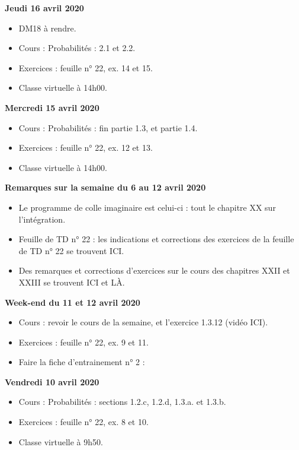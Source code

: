 \documentclass[12pt,a4paper]{article}
\begin{document}
\noindent\textbf{Jeudi 16 avril 2020}
\begin{itemize}
\item DM18 à rendre.
\item Cours : Probabilités : 2.1 et 2.2.
\item Exercices : feuille n° 22, ex. 14 et 15.
\item Classe virtuelle à 14h00.\vspace{.4cm}
\end{itemize}

\noindent\textbf{Mercredi 15 avril 2020}
\begin{itemize}
\item Cours : Probabilités : fin partie 1.3, et partie 1.4.
\item Exercices : feuille n° 22, ex. 12 et 13.
\item Classe virtuelle à 14h00.\vspace{.4cm}
\end{itemize}
 
\noindent\textbf{\bf Remarques sur la semaine du 6 au 12 avril 2020}
\begin{itemize}
\item Le programme de colle imaginaire est celui-ci : tout le chapitre XX sur l'intégration.
\item Feuille de TD n° 22 : les indications et corrections des exercices de la feuille de TD n° 22 se trouvent ICI.
\item Des remarques et corrections d'exercices sur le cours des chapitres XXII et XXIII se trouvent ICI et LÀ.\vspace{.4cm}
\end{itemize}

\noindent\textbf{Week-end du 11 et 12 avril 2020}
\begin{itemize}
\item Cours : revoir le cours de la semaine, et l'exercice 1.3.12 (vidéo ICI).
\item Exercices : feuille n° 22, ex. 9 et 11.
\item Faire la fiche d'entrainement n° 2 : 
\vspace{.4cm}
\end{itemize}

\noindent\textbf{\bf Vendredi 10 avril 2020}
\begin{itemize}
\item Cours : Probabilités : sections 1.2.c, 1.2.d, 1.3.a. et 1.3.b.
\item Exercices : feuille n° 22, ex. 8 et 10.
\item Classe virtuelle à 9h50.\vspace{.4cm}
\end{itemize}
\end{document}
